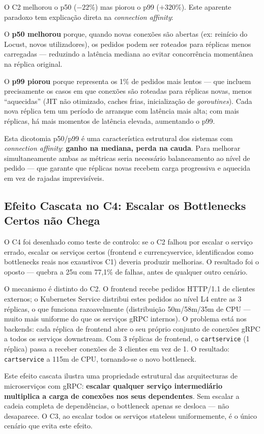 \documentclass[acmsmall,screen=true,nonacm]{acmart}
\begin{document}
O C2 melhorou o p50 ($-22\%$) mas piorou o p99 ($+320\%$). Este aparente paradoxo tem explicação direta na \textit{connection affinity}:

O \textbf{p50 melhorou} porque, quando novas conexões são abertas (ex: reinício do Locust, novos utilizadores), os pedidos podem ser roteados para réplicas menos carregadas — reduzindo a latência mediana ao evitar concorrência momentânea na réplica original.

O \textbf{p99 piorou} porque representa os 1\% de pedidos mais lentos — que incluem precisamente os casos em que conexões são roteadas para réplicas novas, menos ``aquecidas'' (JIT não otimizado, caches frias, inicialização de \textit{goroutines}). Cada nova réplica tem um período de arranque com latência mais alta; com mais réplicas, há mais momentos de latência elevada, aumentando o p99.

Esta dicotomia p50/p99 é uma característica estrutural dos sistemas com \textit{connection affinity}: \textbf{ganho na mediana, perda na cauda}. Para melhorar simultaneamente ambas as métricas seria necessário balanceamento ao nível de pedido — que garante que réplicas novas recebem carga progressiva e aquecida em vez de rajadas imprevisíveis.

\subsection{Efeito Cascata no C4: Escalar os Bottlenecks Certos não Chega}

O C4 foi desenhado como teste de controlo: se o C2 falhou por escalar o serviço errado, escalar os serviços certos (frontend e currencyservice, identificados como bottlenecks reais nos exaustivos C1) deveria produzir melhorias. O resultado foi o oposto — quebra a 25u com 77,1\% de falhas, antes de qualquer outro cenário.

O mecanismo é distinto do C2. O frontend recebe pedidos HTTP/1.1 de clientes externos; o Kubernetes Service distribui estes pedidos ao nível L4 entre as 3 réplicas, o que funciona razoavelmente (distribuição 50m/58m/35m de CPU — muito mais uniforme do que os serviços gRPC internos). O problema está nos backends: cada réplica de frontend abre o seu próprio conjunto de conexões gRPC a todos os serviços downstream. Com 3 réplicas de frontend, o \texttt{cartservice} (1 réplica) passa a receber conexões de 3 clientes em vez de 1. O resultado: \texttt{cartservice} a 115m de CPU, tornando-se o novo bottleneck.

Este efeito cascata ilustra uma propriedade estrutural das arquitecturas de microserviços com gRPC: \textbf{escalar qualquer serviço intermediário multiplica a carga de conexões nos seus dependentes}. Sem escalar a cadeia completa de dependências, o bottleneck apenas se desloca — não desaparece. O C3, ao escalar todos os serviços stateless uniformemente, é o único cenário que evita este efeito.
\end{document}
